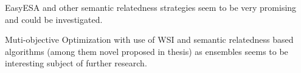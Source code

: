 \documentclass[a4paper, 12pt, oneside]{Thesis} %
\begin{document}
EasyESA and other semantic relatedness strategies seem to be very promising and could be investigated.

Muti-objective Optimization with use of WSI and semantic relatedness based algorithms (among them novel proposed in thesis) as ensembles seems to be interesting subject of further research.








\label{Bibliography}
\end{document}
